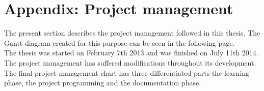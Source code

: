 	\section{Appendix: Project management}
	\label{project_management}
		 The present section describes the project management followed in this thesis. The Gantt diagram created for this purpose can be seen in the following page.
		 \\

		 The thesis was started on February 7th 2013 and was finished on July 11th 2014.    
		 The project management has suffered modifications throughout its development.  The final project management chart has three differentiated parts the learning phase, the project programming and the documentation phase. 
\\

